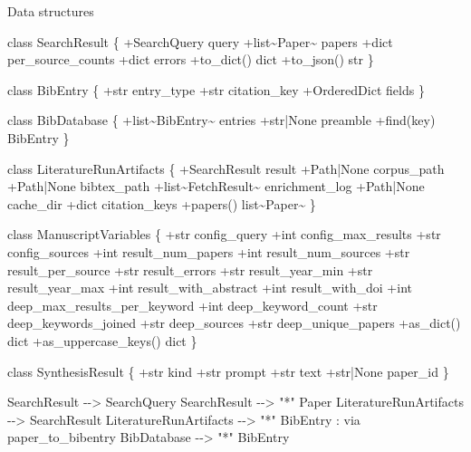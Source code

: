 \documentclass[
  ignorenonframetext,
]{beamer}
\newenvironment{Shaded}{}{}
\newcommand{\NormalTok}[1]{#1}
\begin{document}
\begin{frame}{Data structures}
\begin{Shaded}
\begin{Highlighting}[]
\NormalTok{    class SearchResult \{}
\NormalTok{        +SearchQuery query}
\NormalTok{        +list\textasciitilde{}Paper\textasciitilde{} papers}
\NormalTok{        +dict per\_source\_counts}
\NormalTok{        +dict errors}
\NormalTok{        +to\_dict() dict}
\NormalTok{        +to\_json() str}
\NormalTok{    \}}

\NormalTok{    class BibEntry \{}
\NormalTok{        +str entry\_type}
\NormalTok{        +str citation\_key}
\NormalTok{        +OrderedDict fields}
\NormalTok{    \}}

\NormalTok{    class BibDatabase \{}
\NormalTok{        +list\textasciitilde{}BibEntry\textasciitilde{} entries}
\NormalTok{        +str|None preamble}
\NormalTok{        +find(key) BibEntry}
\NormalTok{    \}}

\NormalTok{    class LiteratureRunArtifacts \{}
\NormalTok{        +SearchResult result}
\NormalTok{        +Path|None corpus\_path}
\NormalTok{        +Path|None bibtex\_path}
\NormalTok{        +list\textasciitilde{}FetchResult\textasciitilde{} enrichment\_log}
\NormalTok{        +Path|None cache\_dir}
\NormalTok{        +dict citation\_keys}
\NormalTok{        +papers() list\textasciitilde{}Paper\textasciitilde{}}
\NormalTok{    \}}

\NormalTok{    class ManuscriptVariables \{}
\NormalTok{        +str config\_query}
\NormalTok{        +int config\_max\_results}
\NormalTok{        +str config\_sources}
\NormalTok{        +int result\_num\_papers}
\NormalTok{        +int result\_num\_sources}
\NormalTok{        +str result\_per\_source}
\NormalTok{        +str result\_errors}
\NormalTok{        +str result\_year\_min}
\NormalTok{        +str result\_year\_max}
\NormalTok{        +int result\_with\_abstract}
\NormalTok{        +int result\_with\_doi}
\NormalTok{        +int deep\_max\_results\_per\_keyword}
\NormalTok{        +int deep\_keyword\_count}
\NormalTok{        +str deep\_keywords\_joined}
\NormalTok{        +str deep\_sources}
\NormalTok{        +str deep\_unique\_papers}
\NormalTok{        +as\_dict() dict}
\NormalTok{        +as\_uppercase\_keys() dict}
\NormalTok{    \}}

\NormalTok{    class SynthesisResult \{}
\NormalTok{        +str kind}
\NormalTok{        +str prompt}
\NormalTok{        +str text}
\NormalTok{        +str|None paper\_id}
\NormalTok{    \}}

\NormalTok{    SearchResult {-}{-}\textgreater{} SearchQuery}
\NormalTok{    SearchResult {-}{-}\textgreater{} "*" Paper}
\NormalTok{    LiteratureRunArtifacts {-}{-}\textgreater{} SearchResult}
\NormalTok{    LiteratureRunArtifacts {-}{-}\textgreater{} "*" BibEntry : via paper\_to\_bibentry}
\NormalTok{    BibDatabase {-}{-}\textgreater{} "*" BibEntry}
\end{Highlighting}
\end{Shaded}
\end{frame}
\end{document}
